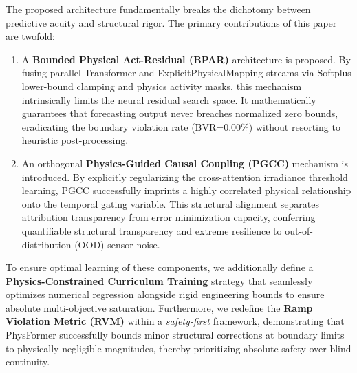 The proposed architecture fundamentally breaks the dichotomy between predictive acuity and structural rigor. The primary contributions of this paper are twofold:

\begin{enumerate}
    \item A \textbf{Bounded Physical Act-Residual (BPAR)} architecture is proposed. By fusing parallel Transformer and ExplicitPhysicalMapping streams via Softplus lower-bound clamping and physics activity masks, this mechanism intrinsically limits the neural residual search space. It mathematically guarantees that forecasting output never breaches normalized zero bounds, eradicating the boundary violation rate (BVR=0.00\%) without resorting to heuristic post-processing.
    
    \item An orthogonal \textbf{Physics-Guided Causal Coupling (PGCC)} mechanism is introduced. By explicitly regularizing the cross-attention irradiance threshold learning, PGCC successfully imprints a highly correlated physical relationship onto the temporal gating variable. This structural alignment separates attribution transparency from error minimization capacity, conferring quantifiable structural transparency and extreme resilience to out-of-distribution (OOD) sensor noise.
\end{enumerate}

To ensure optimal learning of these components, we additionally define a \textbf{Physics-Constrained Curriculum Training} strategy that seamlessly optimizes numerical regression alongside rigid engineering bounds to ensure absolute multi-objective saturation. Furthermore, we redefine the \textbf{Ramp Violation Metric (RVM)} within a \textit{safety-first} framework, demonstrating that PhysFormer successfully bounds minor structural corrections at boundary limits to physically negligible magnitudes, thereby prioritizing absolute safety over blind continuity.


